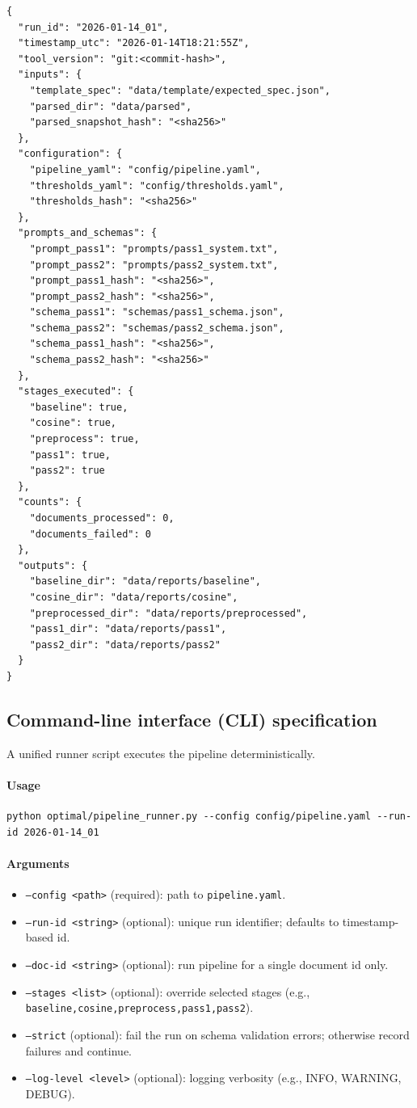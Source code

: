 \begin{verbatim}
{
  "run_id": "2026-01-14_01",
  "timestamp_utc": "2026-01-14T18:21:55Z",
  "tool_version": "git:<commit-hash>",
  "inputs": {
    "template_spec": "data/template/expected_spec.json",
    "parsed_dir": "data/parsed",
    "parsed_snapshot_hash": "<sha256>"
  },
  "configuration": {
    "pipeline_yaml": "config/pipeline.yaml",
    "thresholds_yaml": "config/thresholds.yaml",
    "thresholds_hash": "<sha256>"
  },
  "prompts_and_schemas": {
    "prompt_pass1": "prompts/pass1_system.txt",
    "prompt_pass2": "prompts/pass2_system.txt",
    "prompt_pass1_hash": "<sha256>",
    "prompt_pass2_hash": "<sha256>",
    "schema_pass1": "schemas/pass1_schema.json",
    "schema_pass2": "schemas/pass2_schema.json",
    "schema_pass1_hash": "<sha256>",
    "schema_pass2_hash": "<sha256>"
  },
  "stages_executed": {
    "baseline": true,
    "cosine": true,
    "preprocess": true,
    "pass1": true,
    "pass2": true
  },
  "counts": {
    "documents_processed": 0,
    "documents_failed": 0
  },
  "outputs": {
    "baseline_dir": "data/reports/baseline",
    "cosine_dir": "data/reports/cosine",
    "preprocessed_dir": "data/reports/preprocessed",
    "pass1_dir": "data/reports/pass1",
    "pass2_dir": "data/reports/pass2"
  }
}
\end{verbatim}

\subsection{Command-line interface (CLI) specification}
A unified runner script executes the pipeline deterministically.

\paragraph{Usage}
\begin{verbatim}
python optimal/pipeline_runner.py --config config/pipeline.yaml --run-id 2026-01-14_01
\end{verbatim}

\paragraph{Arguments}
\begin{itemize}
    \item \texttt{--config <path>} (required): path to \texttt{pipeline.yaml}.
    \item \texttt{--run-id <string>} (optional): unique run identifier; defaults to timestamp-based id.
    \item \texttt{--doc-id <string>} (optional): run pipeline for a single document id only.
    \item \texttt{--stages <list>} (optional): override selected stages (e.g., \texttt{baseline,cosine,preprocess,pass1,pass2}).
    \item \texttt{--strict} (optional): fail the run on schema validation errors; otherwise record failures and continue.
    \item \texttt{--log-level <level>} (optional): logging verbosity (e.g., INFO, WARNING, DEBUG).
\end{itemize}

